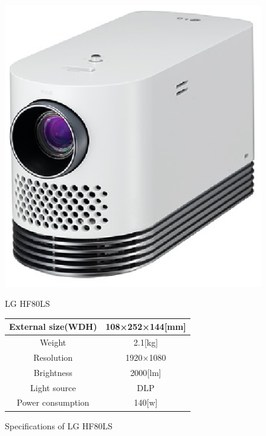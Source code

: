 \documentclass[12pt]{sonota/aislab}
\begin{document}
\begin{figure}
\begin{minipage}{0.4\textwidth}
\begin{center}
\includegraphics[scale=0.5]{figs/lg_projector.eps}
\caption{LG HF80LS}
\label{LG}
\end{center}
\end{minipage}
\begin{minipage}{0.5\textwidth}
\begin{center}
\makeatletter
\def\@captype{table}
\makeatother
\caption{Specifications of LG HF80LS}
	\begin{tabular}[tbp]{|c|c|}
		\hline 
		External size(WDH) & 108×252×144[mm] \\\hline
		Weight & 2.1[kg] \\\hline
		Resolution & 1920×1080 \\\hline
		Brightness & 2000[lm] \\\hline
		Light source & DLP \\\hline
		Power consumption & 140[w] \\\hline
	\end{tabular}
\label{table:LG}
\end{center}
\end{minipage}
\end{figure}
\end{document}
